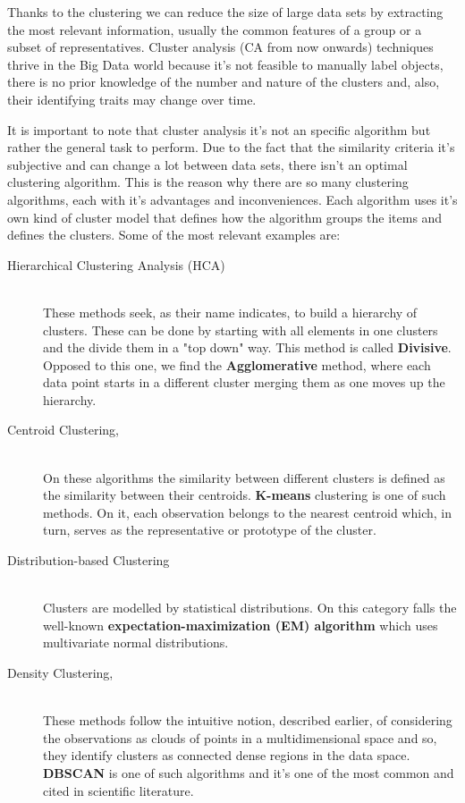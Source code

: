 Thanks to the clustering we can reduce the size of large data sets by extracting the most relevant information, usually the common features of a group or a subset of representatives. Cluster analysis (CA from now onwards) techniques thrive in the Big Data world because it's not feasible to manually label objects, there is no prior knowledge of the number and nature of the clusters and, also, their identifying traits may change over time. 

It is important to note that cluster analysis it's not an specific algorithm but rather the general task to perform. Due to the fact that the similarity criteria it's subjective and can change a lot between data sets, there isn't an optimal clustering algorithm. This is the reason why there are so many  clustering algorithms, each with it's advantages and inconveniences. Each algorithm uses it's own kind of cluster model that defines how the algorithm groups the items and defines the clusters. Some of the most relevant examples are:
\label{subsec:algorithm_kinds}
\begin{description}
\item [Hierarchical Clustering Analysis (HCA)] \hfill \\ 
These methods seek, as their name indicates, to build a hierarchy of clusters. These can be done by starting with all elements in one clusters and the divide them in a "top down" way. This method is called \textbf{Divisive}. Opposed to this one, we find the \textbf{Agglomerative} method, where each data point starts in a different cluster merging them as one moves up the hierarchy.
\item [Centroid Clustering,] \hfill \\ 
On these algorithms the similarity between different clusters is defined as the similarity between their centroids. \textbf{K-means} clustering is one of such methods. On it, each observation belongs to the nearest centroid which, in turn, serves as the representative or prototype of the cluster.
\item [Distribution-based Clustering] \hfill \\ 
Clusters are modelled by statistical distributions. On this category falls the well-known \textbf{expectation-maximization (EM) algorithm} which uses multivariate normal distributions.
\item [Density Clustering,] \hfill \\ 
These methods follow the intuitive notion, described earlier, of considering the observations as clouds of points in a multidimensional space and so, they identify clusters as connected dense regions in the data space. \textbf{DBSCAN} is one of such algorithms and it's one of the most common and cited in scientific literature. 
\end{description}


